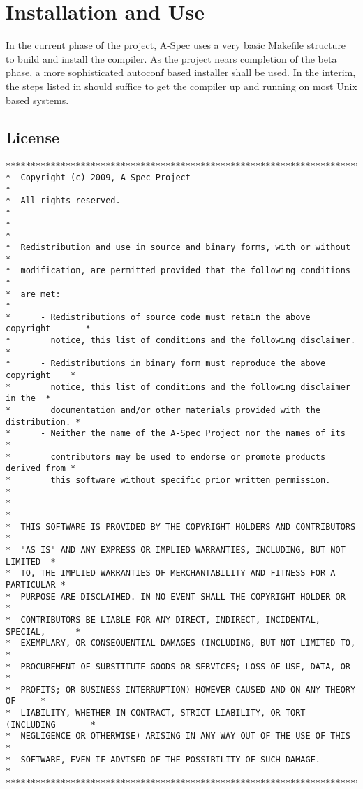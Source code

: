 \documentclass[letterpaper,10pt,draft]{book}
\begin{document}
\chapter{Installation and Use}
   \label{ch:Install}

In the current phase of the project, A-Spec uses a very basic Makefile structure
to build and install the compiler.  As the project nears completion of the beta
phase, a more sophisticated autoconf based installer shall be used.  In the interim,
the steps listed in  should suffice to get the compiler up
and running on most Unix based systems.

\section{License}
   \label{sect:License}

\begin{verbatim}
*******************************************************************************
*  Copyright (c) 2009, A-Spec Project                                         *
*  All rights reserved.                                                       *
*                                                                             *
*  Redistribution and use in source and binary forms, with or without         *
*  modification, are permitted provided that the following conditions         *
*  are met:                                                                   *
*      - Redistributions of source code must retain the above copyright       *
*        notice, this list of conditions and the following disclaimer.        *
*      - Redistributions in binary form must reproduce the above copyright    *
*        notice, this list of conditions and the following disclaimer in the  *
*        documentation and/or other materials provided with the distribution. *
*      - Neither the name of the A-Spec Project nor the names of its          *
*        contributors may be used to endorse or promote products derived from *
*        this software without specific prior written permission.             *
*                                                                             *
*  THIS SOFTWARE IS PROVIDED BY THE COPYRIGHT HOLDERS AND CONTRIBUTORS        *
*  "AS IS" AND ANY EXPRESS OR IMPLIED WARRANTIES, INCLUDING, BUT NOT LIMITED  *
*  TO, THE IMPLIED WARRANTIES OF MERCHANTABILITY AND FITNESS FOR A PARTICULAR *
*  PURPOSE ARE DISCLAIMED. IN NO EVENT SHALL THE COPYRIGHT HOLDER OR          *
*  CONTRIBUTORS BE LIABLE FOR ANY DIRECT, INDIRECT, INCIDENTAL, SPECIAL,      *
*  EXEMPLARY, OR CONSEQUENTIAL DAMAGES (INCLUDING, BUT NOT LIMITED TO,        *
*  PROCUREMENT OF SUBSTITUTE GOODS OR SERVICES; LOSS OF USE, DATA, OR         *
*  PROFITS; OR BUSINESS INTERRUPTION) HOWEVER CAUSED AND ON ANY THEORY OF     *
*  LIABILITY, WHETHER IN CONTRACT, STRICT LIABILITY, OR TORT (INCLUDING       *
*  NEGLIGENCE OR OTHERWISE) ARISING IN ANY WAY OUT OF THE USE OF THIS         *
*  SOFTWARE, EVEN IF ADVISED OF THE POSSIBILITY OF SUCH DAMAGE.               *
*******************************************************************************
\end{verbatim}
\end{document}
